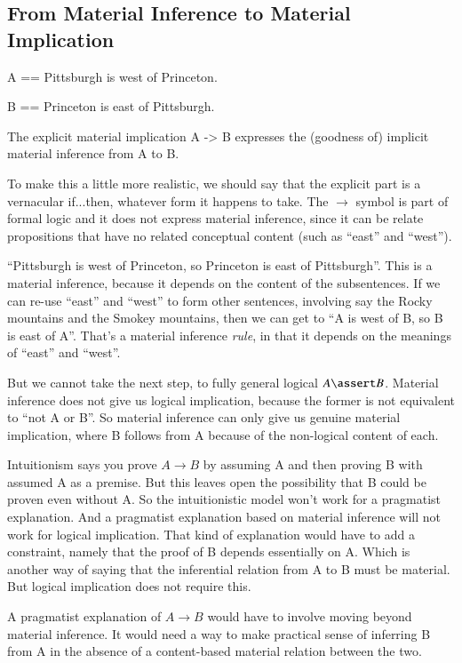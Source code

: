 \subsection{From Material Inference to Material Implication}

A == Pittsburgh is west of Princeton.

B == Princeton is east of Pittsburgh.

The explicit material implication A -> B expresses the (goodness of) implicit
material inference from A to B.

To make this a little more realistic, we should say that the explicit
part is a vernacular if...then, whatever form it happens to take. The
\(\rightarrow\) symbol is part of formal logic and it does not express
material inference, since it can be relate propositions that have no
related conceptual content (such as ``east'' and ``west'').

``Pittsburgh is west of Princeton, so Princeton is east of
Pittsburgh''. This is a material inference, because it depends on the
content of the subsentences. If we can re-use ``east'' and ``west'' to
form other sentences, involving say the Rocky mountains and the
Smokey mountains, then we can get to ``A is west of B, so B is east of
A''. That's a material inference \textit{rule}, in that it depends on the
meanings of ``east'' and ``west''.

But we cannot take the next step, to fully general logical \(A\linfer
B\). Material inference does not give us logical implication, because
the former is not equivalent to ``not A or B''. So material inference
can only give us genuine material implication, where B follows from A
because of the non-logical content of each.

Intuitionism says you prove \(A\rightarrow B\) by assuming A and then
proving B with assumed A as a premise. But this leaves open the
possibility that B could be proven even without A. So the
intuitionistic model won't work for a pragmatist explanation. And a
pragmatist explanation based on material inference will not work for
logical implication. That kind of explanation would have to add a
constraint, namely that the proof of B depends essentially on A. Which
is another way of saying that the inferential relation from A to B
must be material. But logical implication does not require this.


A pragmatist explanation of \(A\rightarrow B\) would have to involve
moving beyond material inference. It would need a way to make
practical sense of inferring B from A in the absence of a content-based
material relation between the two.

